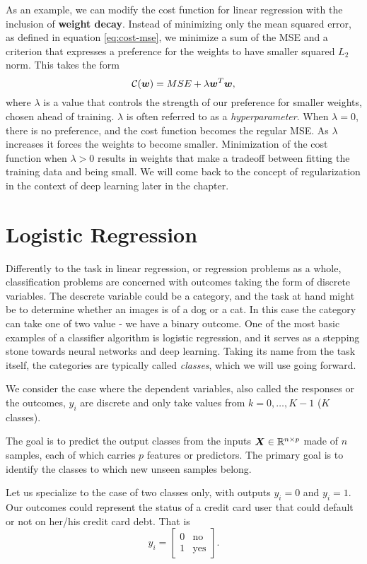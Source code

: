As an example, we can modify the cost function for linear regression with the
inclusion of \textbf{weight decay}. Instead of minimizing only the mean squared
error, as defined in equation \ref{eq:cost-mse}, we minimize a sum of the MSE and
a criterion that expresses a preference for the weights to have smaller squared
$L_2$ norm. This takes the form
\begin{equation}
	\mathcal{C}({\boldsymbol{w}}) = MSE + \lambda {\boldsymbol{w}}^T {\boldsymbol{w}},
\end{equation}
where $\lambda$ is a value that controls the strength of our preference for smaller
weights, chosen ahead of training. $\lambda$ is often referred to as a 
\textit{hyperparameter}. When $\lambda = 0$, there is no preference, and
the cost function becomes the regular MSE. As $\lambda$ increases it forces the
weights to become smaller. Minimization of the cost function when $\lambda > 0$
results in weights that make a tradeoff between fitting the training data and being
small\cite{Goodfellow-et-al-2016}. We will come back to the concept of regularization
in the context of deep learning later in the chapter.

\section{Logistic Regression}\label{seq:logistic}
Differently to the task in linear regression, or regression problems as a whole, 
classification problems are concerned with outcomes taking the form of discrete 
variables. The descrete variable could be a category, and the task at hand might be
to determine whether an images is of a dog or a cat. In this case the category can
take one of two value - we have a binary outcome. One of the most basic examples
of a classifier algorithm is logistic regression, and it serves as a stepping stone
towards neural networks and deep learning. Taking its name from the task itself, the
categories are typically called \textit{classes}, which we will use going forward.

We consider the case where the dependent variables, also called the
responses or the outcomes, $y_i$ are discrete and only take values
from $k=0,\dots,K-1$ ($K$ classes).

The goal is to predict the output classes from the inputs 
${\boldsymbol{X}}\in\mathbb{R}^{n\times p}$ made of $n$ samples, each of which carries $p$ 
features or predictors. The primary goal is to identify the classes to which new 
unseen samples belong.
 
Let us specialize to the case of two classes only, with outputs
$y_i=0$ and $y_i=1$. Our outcomes could represent the status of a
credit card user that could default or not on her/his credit card
debt. That is
\begin{equation}
	y_i = \begin{bmatrix} 0 & \mathrm{no}\\  1 & \mathrm{yes} \end{bmatrix}.
\end{equation}

